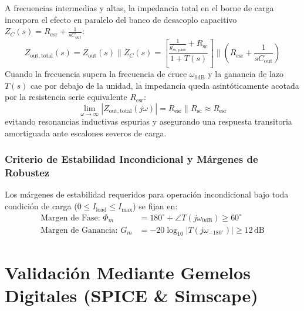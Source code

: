 A frecuencias intermedias y altas, la impedancia total en el borne de carga incorpora el efecto en paralelo del banco de desacoplo capacitivo $Z_C(s) = R_{\mathrm{esr}} + \frac{1}{s C_{\mathrm{out}}}$:
\begin{equation}
    Z_{\mathrm{out,total}}(s) = Z_{\mathrm{out}}(s) \parallel Z_C(s) = \left[ \frac{\frac{1}{g_{m,\mathrm{pass}}} + R_{\mathrm{sc}}}{1 + T(s)} \right] \parallel \left( R_{\mathrm{esr}} + \frac{1}{s C_{\mathrm{out}}} \right)
    \label{eq:zout_total}
\end{equation}
Cuando la frecuencia supera la frecuencia de cruce $\omega_{0\mathrm{dB}}$ y la ganancia de lazo $T(s)$ cae por debajo de la unidad, la impedancia queda asintóticamente acotada por la resistencia serie equivalente $R_{\mathrm{esr}}$:
\begin{equation}
    \lim_{\omega \to \infty} |Z_{\mathrm{out,total}}(j\omega)| = R_{\mathrm{esr}} \parallel R_{\mathrm{sc}} \approx R_{\mathrm{esr}}
\end{equation}
evitando resonancias inductivas espurias y asegurando una respuesta transitoria amortiguada ante escalones severos de carga.

\subsubsection{Criterio de Estabilidad Incondicional y Márgenes de Robustez}

Los márgenes de estabilidad requeridos para operación incondicional bajo toda condición de carga ($0 \le I_{\mathrm{load}} \le I_{\mathrm{max}}$) se fijan en:
\begin{align}
    \text{Margen de Fase: } \Phi_m &= 180^\circ + \angle T(j\omega_{0\mathrm{dB}}) \ge 60^\circ \\
    \text{Margen de Ganancia: } G_m &= -20 \log_{10} |T(j\omega_{-180^\circ})| \ge 12\,\mathrm{dB}
\end{align}

\section[Validación Mediante Gemelos Digitales]{Validación Mediante Gemelos Digitales (SPICE \& Simscape)}
\label{sec:digital_twins_validation}

